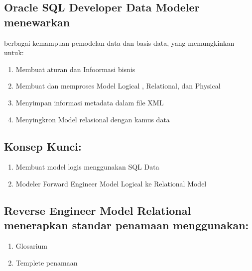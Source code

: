 \documentclass{article}
\begin{document}
\subsection {Oracle SQL Developer Data Modeler menewarkan} berbagai kemampuan pemodelan data dan basis data, yang memungkinkan untuk:
\begin{enumerate}
\item Membuat  aturan dan Infoormasi bisnis
\item Membuat dan memproses Model Logical , Relational, dan Physical
\item Menyimpan informasi metadata dalam file XML
\item Menyingkron Model relasional dengan kamus data
\end{enumerate}
\subsection {Konsep Kunci:}
\begin{enumerate}

\item Membuat model logis menggunakan SQL Data 
\item Modeler Forward Engineer Model Logical ke Relational Model
\end {enumerate}

\subsection {Reverse Engineer Model Relational menerapkan standar penamaan menggunakan:}
\begin{enumerate}
\item Glosarium
\item Templete penamaan 
\end {enumerate}
\usepackage{Kesulitan: Pemula-Lokakarya ini cocok untuk seseorang yang belum pernah menggunakan Oracle SQL Developer Data Modeler tetapi  memiliki beberapa pengetahuan dasar tentang metode dan terminologi perancangan}
\end{document}
